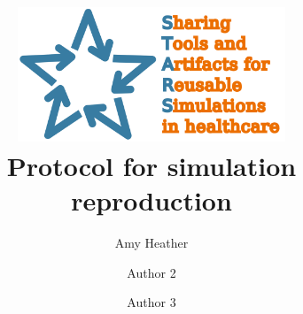 \title{
    \vspace{-3cm}
    \includegraphics[width=8cm]{images/stars_pointy_v2_text.png}\\[1cm]
    \textbf{Protocol for simulation reproduction}
}

\renewcommand{\thefootnote}{\fnsymbol{footnote}}
\author[1]{ Amy Heather}
\author[1]{ Author 2}
\author[1]{ Author 3}

\date{}